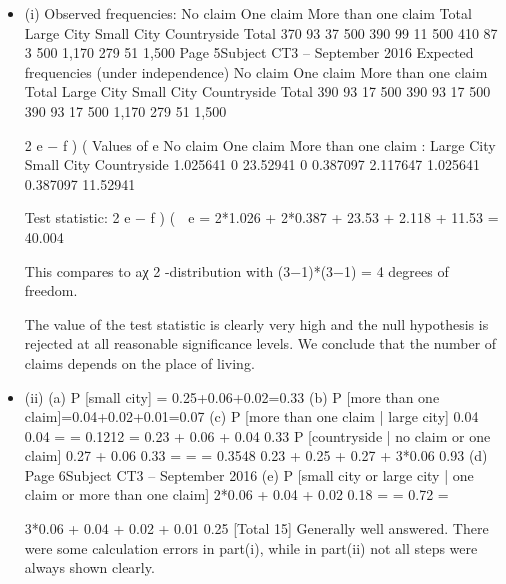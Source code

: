 \documentclass[a4paper,12pt]{article}
\begin{document}
\begin{itemize}
\item (i)
Observed frequencies:
No claim
One claim
More than one claim
Total
Large City Small City Countryside Total
370
93
37
500 390
99
11
500 410
87
3
500 1,170
279
51
1,500
Page 5Subject CT3  – September 2016 
Expected frequencies (under independence)
No claim
One claim
More than one claim
Total
Large City Small City Countryside Total
390
93
17
500 390
93
17
500 390
93
17
500 1,170
279
51
1,500

2
e − f )
(
Values of
e
No claim
One claim
More than one claim
:
Large City Small City Countryside
1.025641
0
23.52941 0
0.387097
2.117647 1.025641
0.387097
11.52941

Test statistic:
2
e − f )
(

e
= 2*1.026 + 2*0.387 + 23.53 + 2.118 + 11.53 = 40.004

This compares to aχ 2 -distribution with (3−1)*(3−1) = 4 degrees of freedom.

The value of the test statistic is clearly very high and the null hypothesis is
rejected at all reasonable significance levels. We conclude that the number of
claims depends on the place of living.

\item (ii)
(a) P [small city] = 0.25+0.06+0.02=0.33 
(b) P [more than one claim]=0.04+0.02+0.01=0.07 
(c) P [more than one claim | large city]
0.04
0.04
=
= 0.1212
=
0.23 + 0.06 + 0.04 0.33 
P [countryside | no claim or one claim]
0.27 + 0.06
0.33
=
=
= 0.3548
0.23 + 0.25 + 0.27 + 3*0.06 0.93 
(d)
Page 6Subject CT3  – September 2016 
(e)
P [small city or large city | one claim or more than one claim]
2*0.06 + 0.04 + 0.02
0.18
=
= 0.72
=

3*0.06 + 0.04 + 0.02 + 0.01 0.25
[Total 15]
Generally well answered. There were some calculation errors in part(i), while
in part(ii) not all steps were always shown clearly.
\end{itemize}
\end{document}
